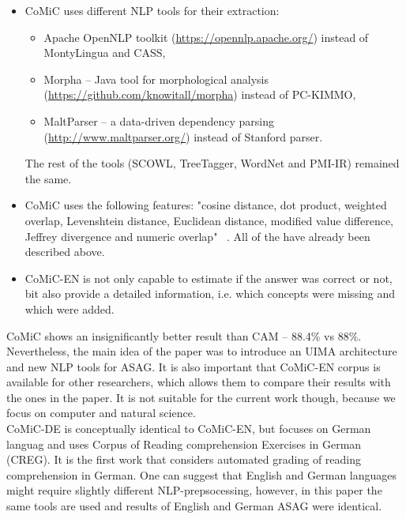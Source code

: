 \documentclass[11pt]{report}
\numberwithin{equation}{section} %
\begin{document}
\begin{itemize}
\item CoMiC uses different NLP tools for their extraction:
\begin{itemize}
\item Apache OpenNLP toolkit (\url{https://opennlp.apache.org/}) instead of MontyLingua and CASS,
\item Morpha -- Java tool for morphological analysis (\url{https://github.com/knowitall/morpha}) instead of PC-KIMMO,
\item MaltParser -- a data-driven dependency parsing (\url{http://www.maltparser.org/}) instead of Stanford parser.
\end{itemize}
The rest of the tools (SCOWL, TreeTagger, WordNet and PMI-IR) remained the same.
\item CoMiC uses the following features: "cosine distance, dot product, weighted overlap, Levenshtein distance, Euclidean distance, modified value difference, Jeffrey divergence and numeric overlap" ~\cite{CoMiC-EN}. All of the have already been described above.
\item CoMiC-EN is not only capable to estimate if the answer was correct or not, bit also provide a detailed information, i.e. which concepts were missing and which were added.
\end{itemize} 

CoMiC shows an insignificantly better result than CAM -- 88.4\% vs 88\%. Nevertheless, the main idea of the paper was to introduce an UIMA architecture and new NLP tools for ASAG. It is also important that CoMiC-EN corpus is available for other researchers, which allows them to compare their results with the ones in the paper. It is not suitable for the current work though, because we focus on computer and natural science.\\

CoMiC-DE is conceptually identical to CoMiC-EN, but focuses on German languag and uses Corpus of Reading comprehension Exercises
in German (CREG). It is the first work that considers automated grading of reading comprehension in German. One can suggest that English and German languages might require slightly different NLP-prepsocessing, however, in this paper the same tools are used and results of English and German ASAG were identical.\\
\end{document}
